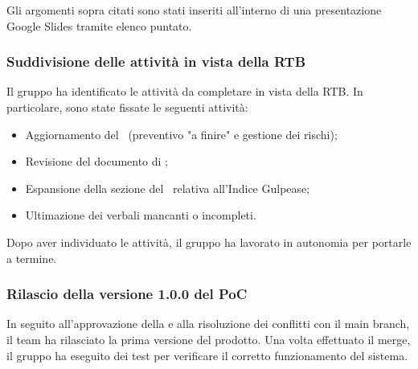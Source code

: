 \vspace{0.5\baselineskip}
\par Gli argomenti sopra citati sono stati inseriti all'interno di una presentazione Google Slides tramite elenco puntato.

\subsubsection{Suddivisione delle attività in vista della RTB}
\par Il gruppo ha identificato le attività da completare in vista della RTB. In particolare, sono state fissate le seguenti attività:
\begin{itemize}
	\item Aggiornamento del \PdP\ (preventivo "a finire" e gestione dei rischi);
	\item Revisione del documento di \AdR;
	\item Espansione della sezione del \PdQ\ relativa all'Indice Gulpease;
	\item Ultimazione dei verbali mancanti o incompleti.
\end{itemize}

\vspace{0.5\baselineskip}
\par Dopo aver individuato le attività, il gruppo ha lavorato in autonomia per portarle a termine.

\subsubsection{Rilascio della versione 1.0.0 del PoC}
\par In seguito all'approvazione della  e alla risoluzione dei conflitti con il main branch, il team ha rilasciato la prima versione del prodotto.
Una volta effettuato il merge, il gruppo ha eseguito dei test per verificare il corretto funzionamento del sistema.